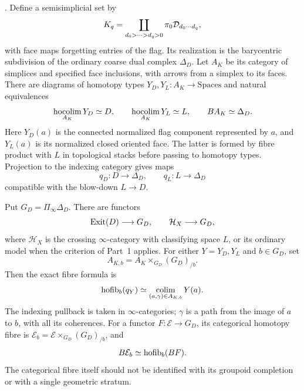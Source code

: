 \begin{theorem}
\label{P4a2}
. Define a semisimplicial set by
\[
 K_q=\coprod_{d_0>\cdots>d_q>0}\pi_0\mathcal D_{d_0\cdots d_q},
\]
with face maps forgetting entries of the flag. Its realization is the barycentric subdivision of the ordinary coarse dual complex $\Delta_D$. Let $A_K$ be its category of simplices and specified face inclusions, with arrows from a simplex to its faces. There are diagrams of homotopy types $Y_D,Y_L:A_K\to\mathrm{Spaces}$ and natural equivalences
\[
 \operatorname*{hocolim}_{A_K}Y_D\simeq D,\qquad
 \operatorname*{hocolim}_{A_K}Y_L\simeq L,\qquad BA_K\simeq\Delta_D.
\]
Here $Y_D(a)$ is the connected normalized flag component represented by $a$, and $Y_L(a)$ is its normalized closed oriented face. The latter is formed by fibre product with $L$ in topological stacks before passing to homotopy types. Projection to the indexing category gives maps
\[
 q_D:D\longrightarrow\Delta_D,
 \qquad q_L:L\longrightarrow\Delta_D
\]
compatible with the blow-down $L\to D$.

Put $G_D=\Pi_\infty\Delta_D$. There are functors
\[
 \operatorname{Exit}(D)\longrightarrow G_D,\qquad \mathcal H_X\longrightarrow G_D,
\]
where $\mathcal H_X$ is the crossing $\infty$-category with classifying space $L$, or its ordinary model when the criterion of Part~1 applies. For either $Y=Y_D,Y_L$ and $b\in G_D$, set
\[
 A_{K,b}=A_K\times_{G_D}(G_D)_{/b}.
\]
Then the exact fibre formula is
\begin{equation}
 \label{eq:boundary-fibre}
 \operatorname{hofib}_b(q_Y)\simeq
 \operatorname*{colim}_{(a,\gamma)\in A_{K,b}}Y(a).
\end{equation}
The indexing pullback is taken in $\infty$-categories; $\gamma$ is a path from the image of $a$ to $b$, with all its coherences. For a functor $F:\mathcal E\to G_D$, its categorical homotopy fibre is
$\mathcal E_b=\mathcal E\times_{G_D}(G_D)_{/b}$, and
\[
 B\mathcal E_b\simeq\operatorname{hofib}_b(BF).
\]
The categorical fibre itself should not be identified with its groupoid completion or with a single geometric stratum.
\end{theorem}
